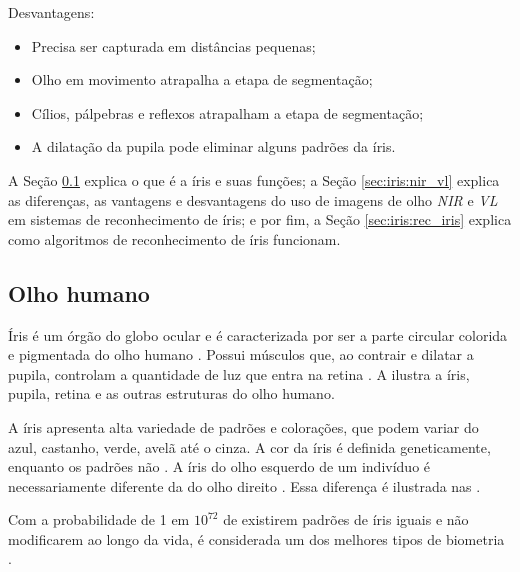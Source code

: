 \par Desvantagens:

\begin{itemize}
    \item Precisa ser capturada em distâncias pequenas;
    \item Olho em movimento atrapalha a etapa de segmentação;
    \item Cílios, pálpebras e reflexos atrapalham a etapa de segmentação;
    \item A dilatação da pupila pode eliminar alguns padrões da íris.
\end{itemize}

\par A Seção \ref{sec:iris:olho} explica o que é a íris e suas funções; a Seção \ref{sec:iris:nir_vl} explica as diferenças, as vantagens e desvantagens do uso de imagens de olho \textit{\acrfull{NIR}} e \textit{\acrfull{VL}} em sistemas de reconhecimento de íris; e por fim, a Seção \ref{sec:iris:rec_iris} explica como algoritmos de reconhecimento de íris funcionam.

\subsection{Olho humano}\label{sec:iris:olho}

\par Íris é um órgão do globo ocular e é caracterizada por ser a parte circular colorida e pigmentada do olho humano \cite{irisDaugman}. Possui músculos que, ao contrair e dilatar a pupila, controlam a quantidade de luz que entra na retina \cite{adlerIris2003}. A  ilustra a íris, pupila, retina e as outras estruturas do olho humano.

%

\par A íris apresenta alta variedade de padrões e colorações, que podem variar do azul, castanho, verde, avelã até o cinza. A cor da íris é definida geneticamente, enquanto os padrões não \cite{adlerIris2003}. A íris do olho esquerdo de um indivíduo é necessariamente diferente da do olho direito \cite{wayman2005biometric}. Essa diferença é ilustrada nas .

\par Com a probabilidade de 1 em $10^{72}$ de existirem padrões de íris iguais e não modificarem ao longo da vida, é considerada um dos melhores tipos de biometria \cite{iris_UFRJ}.

